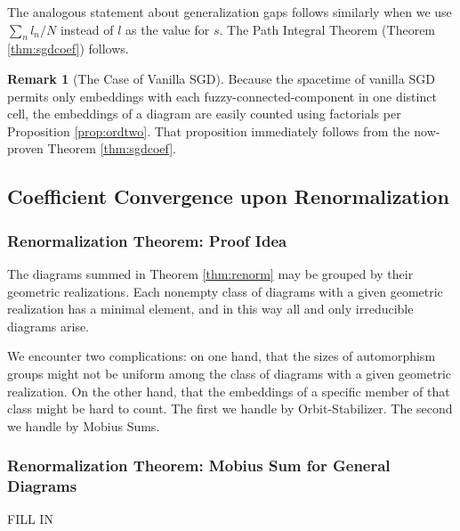 \documentclass{article}
\theoremstyle{plain}
\theoremstyle{definition}
\newtheorem{rmk}{Remark}
\begin{document}
            The analogous statement about generalization gaps follows similarly
            when we use $\sum_n l_n/N$ instead of $l$ as the value for $s$. 
            The Path Integral Theorem (Theorem \ref{thm:sgdcoef}) follows.

            \begin{rmk}[The Case of Vanilla SGD]
                Because the spacetime of vanilla SGD permits only embeddings
                with each fuzzy-connected-component in one distinct cell, the
                embeddings of a diagram are easily counted using factorials
                per Proposition \ref{prop:ordtwo}.  That proposition immediately
                follows from the now-proven Theorem \ref{thm:sgdcoef}.
            \end{rmk}

    \subsection{Coefficient Convergence upon Renormalization}
        \subsubsection*{Renormalization Theorem: Proof Idea}
            The diagrams summed in Theorem \ref{thm:renorm} may be grouped by
            their geometric realizations.  Each nonempty class of diagrams with
            a given geometric realization has a minimal element, and in this
            way all and only irreducible diagrams arise. 

            We encounter two complications: on one hand, that the sizes of
            automorphism groups might not be uniform among the class of
            diagrams with a given geometric realization.  On the other hand,
            that the embeddings of a specific member of that class might be
            hard to count.  The first we handle by Orbit-Stabilizer.  The
            second we handle by Mobius Sums.

        \subsubsection*{Renormalization Theorem: Mobius Sum for General Diagrams}
            {\color{moor} FILL IN}
            
\end{document}
